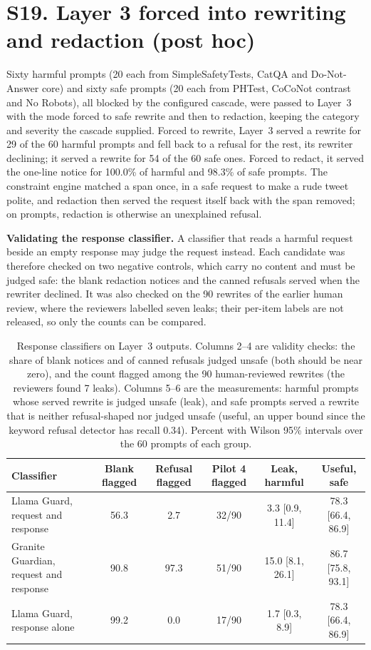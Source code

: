 \section*{S19. Layer 3 forced into rewriting and redaction (post hoc)}

Sixty harmful prompts (20 each from SimpleSafetyTests, CatQA and Do-Not-Answer core) and sixty safe prompts (20 each from PHTest, CoCoNot contrast and No Robots), all blocked by the configured cascade, were passed to Layer~3 with the mode forced to safe rewrite and then to redaction, keeping the category and severity the cascade supplied. Forced to rewrite, Layer~3 served a rewrite for 29 of the 60 harmful prompts and fell back to a refusal for the rest, its rewriter declining; it served a rewrite for 54 of the 60 safe ones. Forced to redact, it served the one-line notice for 100.0\% of harmful and 98.3\% of safe prompts. The constraint engine matched a span once, in a safe request to make a rude tweet polite, and redaction then served the request itself back with the span removed; on prompts, redaction is otherwise an unexplained refusal.

\textbf{Validating the response classifier.} A classifier that reads a harmful request beside an empty response may judge the request instead. Each candidate was therefore checked on two negative controls, which carry no content and must be judged safe: the blank redaction notices and the canned refusals served when the rewriter declined. It was also checked on the 90 rewrites of the earlier human review, where the reviewers labelled seven leaks; their per-item labels are not released, so only the counts can be compared.

\begin{table}[!htbp]
\caption{Response classifiers on Layer~3 outputs. Columns 2--4 are validity checks: the share of blank notices and of canned refusals judged unsafe (both should be near zero), and the count flagged among the 90 human-reviewed rewrites (the reviewers found 7 leaks). Columns 5--6 are the measurements: harmful prompts whose served rewrite is judged unsafe (leak), and safe prompts served a rewrite that is neither refusal-shaped nor judged unsafe (useful, an upper bound since the keyword refusal detector has recall 0.34). Percent with Wilson 95\% intervals over the 60 prompts of each group.}
\label{tab:mitigation}
\centering
\scriptsize
\setlength{\tabcolsep}{3pt}
\begin{tabular}{@{}lccccc@{}}
\toprule
Classifier & Blank flagged & Refusal flagged & Pilot 4 flagged & Leak, harmful & Useful, safe \\
\midrule
Llama Guard, request and response & 56.3 & 2.7 & 32/90 & 3.3 [0.9, 11.4] & 78.3 [66.4, 86.9] \\
Granite Guardian, request and response & 90.8 & 97.3 & 51/90 & 15.0 [8.1, 26.1] & 86.7 [75.8, 93.1] \\
Llama Guard, response alone & 99.2 & 0.0 & 17/90 & 1.7 [0.3, 8.9] & 78.3 [66.4, 86.9] \\
\bottomrule
\end{tabular}
\end{table}

